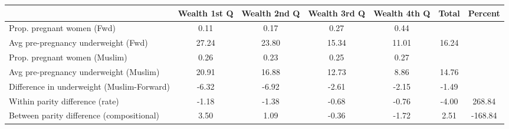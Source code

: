 \begin{tabular}{l*{6}{c}}
\toprule
            &\multicolumn{1}{c}{Wealth 1st Q}&\multicolumn{1}{c}{Wealth 2nd Q}&\multicolumn{1}{c}{Wealth 3rd Q}&\multicolumn{1}{c}{Wealth 4th Q}&\multicolumn{1}{c}{Total}&\multicolumn{1}{c}{Percent}\\
\midrule
\midrule
Prop. pregnant women (Fwd)&        0.11&        0.17&        0.27&        0.44&            &            \\
Avg pre-pregnancy underweight (Fwd)&       27.24&       23.80&       15.34&       11.01&       16.24&            \\
Prop. pregnant women (Muslim)&        0.26&        0.23&        0.25&        0.27&            &            \\
Avg pre-pregnancy underweight (Muslim)&       20.91&       16.88&       12.73&        8.86&       14.76&            \\
Difference in underweight (Muslim-Forward)&       -6.32&       -6.92&       -2.61&       -2.15&       -1.49&            \\
Within parity difference (rate)&       -1.18&       -1.38&       -0.68&       -0.76&       -4.00&      268.84\\
Between parity difference (compositional)&        3.50&        1.09&       -0.36&       -1.72&        2.51&     -168.84\\
\bottomrule
\end{tabular}

